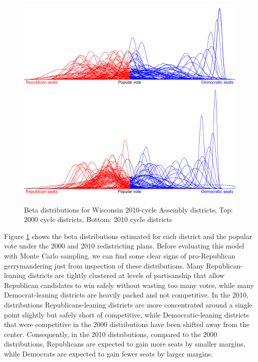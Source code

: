 \documentclass[preprint,12pt]{article}
\begin{document}
\begin{figure}[htb!]
    \begin{center}
        \includegraphics[scale=0.25]{../Figures/WI_compared/Betas_cropped.png}
        \caption{Beta distributions for Wisconsin 2010-cycle Assembly districts, Top: 2000 cycle districts, Bottom: 2010 cycle districts}\label{fig:BetasWI}
    \end{center}
\end{figure}
 
Figure \ref{fig:BetasWI} shows the beta distributions estimated for each district and the popular vote under the 2000 and 2010 redistricting plans. 
Before evaluating this model with Monte Carlo sampling, we can find some clear signs of pro-Republican gerrymandering just from inspection of these distributions. 
Many Republican-leaning districts are tightly clustered at levels of partisanship that allow Republican candidates to win safely without wasting too many votes, while many Democrat-leaning districts are heavily packed and not competitive.
In the 2010, distributions Republicans-leaning districts are more concentrated around a single point slightly but safely short of competitive, while Democratic-leaning districts that were competitive in the 2000 distributions have been shifted away from the center.
Consequently, in the 2010 distributions, compared to the 2000 distributions, Republicans are expected to gain more seats by smaller margins, while Democrats are expected to gain fewer seats by larger margins.
\end{document}
